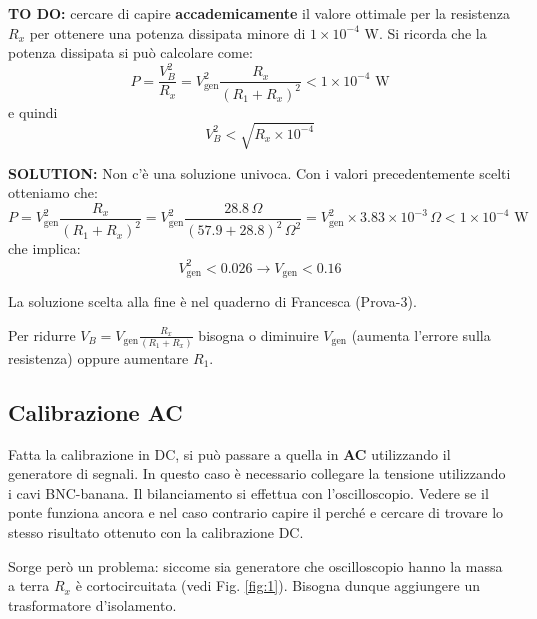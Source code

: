 \documentclass[../main/main.tex]{subfiles}
\begin{document}
\begin{redbox}
\textbf{TO DO:} cercare di capire \textbf{accademicamente} il valore ottimale per la resistenza \( R_x \) per ottenere una potenza dissipata minore di \( 1 \times 10^{-4 } \) W.
Si ricorda che la potenza dissipata si può calcolare come:
\begin{equation*}
  P = \frac{V_B^2}{R_x} = V_{\text{gen}}^2 \frac{R_x}{(R_1+R_x)^2} < 1 \times 10^{-4} \text{ W}
\end{equation*}
e quindi
\begin{equation*}
  V_B^2 < \sqrt{R_x \times 10^{-4} }
\end{equation*}
\end{redbox}

\begin{greenbox}
\textbf{SOLUTION:} Non c'è una soluzione univoca. Con i valori precedentemente scelti otteniamo che:
\begin{equation*}
  P = V_{\text{gen}}^2 \frac{R_x}{(R_1+R_x)^2} = V_{\text{gen}}^2 \frac{28.8 \, \Omega }{(57.9 + 28.8)^2 \, \Omega^2}
  = V_{\text{gen}}^2 \times 3.83 \times 10^{-3} \, \Omega < 1 \times 10^{-4} \text{ W}
\end{equation*}
che implica:
\begin{equation*}
  V_{\text{gen}}^2 < 0.026  \longrightarrow V_{\text{gen}} < 0.16
\end{equation*}

La soluzione scelta alla fine è nel quaderno di Francesca (Prova-3).
\end{greenbox}

\begin{orangebox}
Per ridurre \( V_B = V_{\text{gen}} \frac{R_x}{(R_1+R_x)} \) bisogna o diminuire \( V_{\text{gen}} \) (aumenta l'errore sulla resistenza) oppure aumentare \( R_1 \).
\end{orangebox}

\subsection{Calibrazione AC}
Fatta la calibrazione in DC, si può passare a quella in \textbf{AC} utilizzando il generatore di segnali. In questo caso è necessario collegare la tensione utilizzando i cavi BNC-banana. Il bilanciamento si effettua con l'oscilloscopio. Vedere se il ponte funziona ancora e nel caso contrario capire il perché e cercare di trovare lo stesso risultato ottenuto con la calibrazione DC.

Sorge però un problema: siccome sia generatore che oscilloscopio hanno la massa a terra \( R_x \) è cortocircuitata (vedi Fig. \ref{fig:1}). Bisogna dunque aggiungere un trasformatore d'isolamento.
\end{document}
